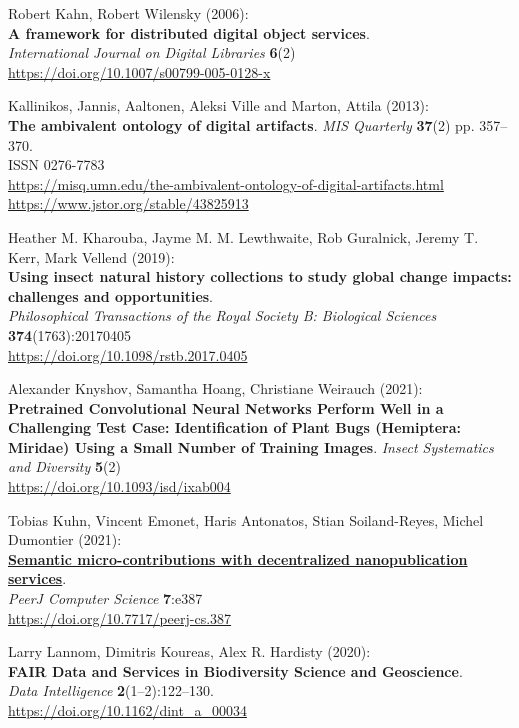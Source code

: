 \begin{thebibliography}{9}
Robert Kahn, Robert Wilensky (2006):\\
\textbf{A framework for distributed digital object services}.\\
\emph{International Journal on Digital Libraries} \textbf{6}(2)\\
\url{https://doi.org/10.1007/s00799-005-0128-x}

Kallinikos, Jannis, Aaltonen, Aleksi Ville and Marton, Attila (2013):\\
\textbf{The ambivalent ontology of digital artifacts}. 
\emph{MIS Quarterly} \textbf{37}(2) pp. 357--370.\\
ISSN 0276-7783\\
\url{https://misq.umn.edu/the-ambivalent-ontology-of-digital-artifacts.html}
\url{https://www.jstor.org/stable/43825913}

Heather M. Kharouba, Jayme M. M. Lewthwaite, Rob Guralnick, Jeremy T. Kerr, Mark Vellend (2019):\\
\textbf{Using insect natural history collections to study global change impacts: challenges and opportunities}.\\
\emph{Philosophical Transactions of the Royal Society B: Biological Sciences}
\textbf{374}(1763):20170405\\
\url{https://doi.org/10.1098/rstb.2017.0405}

Alexander Knyshov, Samantha Hoang, Christiane Weirauch (2021):\\
\textbf{Pretrained Convolutional Neural Networks Perform Well in a Challenging Test Case:
Identification of Plant Bugs (Hemiptera: Miridae) Using a Small Number
of Training Images}. 
\emph{Insect Systematics and Diversity} \textbf{5}(2)\\
\url{https://doi.org/10.1093/isd/ixab004}

Tobias Kuhn, Vincent Emonet, Haris Antonatos, Stian
Soiland-Reyes, Michel Dumontier (2021):\\
\href{../../../2021/phd/nanopub/}{\textbf{Semantic micro-contributions
with decentralized nanopublication services}}.\\
\emph{PeerJ Computer Science} \textbf{7}:e387\\
\url{https://doi.org/10.7717/peerj-cs.387}

Larry Lannom, Dimitris Koureas, Alex R. Hardisty (2020):\\
\textbf{FAIR Data and Services in Biodiversity Science and
Geoscience}.\\
\emph{Data Intelligence} \textbf{2}(1--2):122--130.\\
\url{https://doi.org/10.1162/dint_a_00034}


\end{thebibliography}
